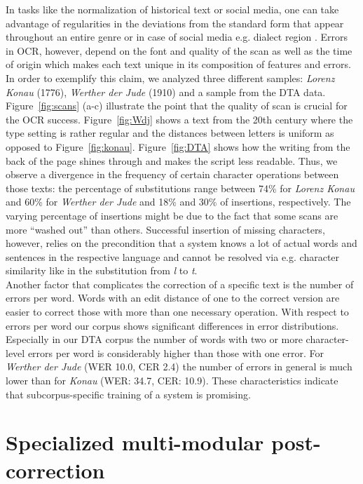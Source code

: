 \documentclass[11pt,letterpaper]{article}
\begin{document}
In tasks like the normalization of historical text \cite{Bollmann12} or social media, one can take advantage of regularities in the deviations from the standard form that appear throughout an entire genre or in case of social media e.g. dialect region \cite{Eisenstein2013}. Errors in OCR, however, depend on the font and quality of the scan as well as the time of origin which makes each text unique in its composition of features and errors.\\
In order to exemplify this claim, we analyzed three different samples: \textit{Lorenz Konau} (1776), \textit{Werther der Jude} (1910) and a sample from the DTA data. Figure~\ref{fig:scans} (a-c) illustrate the point that the quality of scan is crucial for the OCR success. Figure~\ref{fig:Wdj} shows a text from the 20th century where the type setting is rather regular and the distances between letters is uniform as opposed to Figure~\ref{fig:konau}. Figure~\ref{fig:DTA} shows how the writing from the back of the page shines through and makes the script less readable. Thus, we observe a divergence in the frequency of certain character operations between those texts: the percentage of substitutions range between 74\% for \textit{Lorenz Konau} and 60\% for \textit{Werther der Jude} and 18\% and 30\% of insertions, respectively. The varying percentage of insertions might be due to the fact that some scans are more ``washed out'' than others. Successful insertion of missing characters, however, relies on the precondition that a system knows a lot of actual words and sentences in the respective language and cannot be resolved via e.g. character similarity like in the substitution from \textit{l} to \textit{t}.\\
Another factor that complicates the correction of a specific text is the number of errors per word. Words with an edit distance of one to the correct version are easier to correct those with more than one necessary operation. With respect to errors per word our corpus shows significant differences in error distributions. Especially in our DTA corpus the number of words with two or more character-level errors per word is considerably higher than those with one error. For \textit{Werther der Jude} (WER 10.0, CER 2.4) the number of errors in general is much lower than for \textit{Konau} (WER: 34.7, CER: 10.9). These characteristics indicate that subcorpus-specific training of a system is promising.



\section{Specialized multi-modular post-correction}\label{sec:system}
\end{document}
